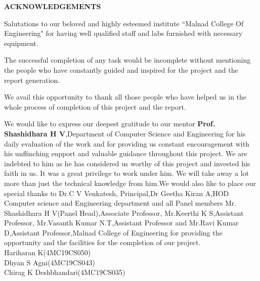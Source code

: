 \newpage
\vspace*{1\baselineskip}
\begin{center}
\thispagestyle{empty}
\LARGE{\textbf{ACKNOWLEDGEMENTS}}\\[1cm]
\end{center}
\vspace{0.05cm}
\doublespacing
Salutations to our beloved and highly esteemed institute ``Malnad College Of Engineering" for having well qualified staff and labs furnished with necessary equipment.

The successful completion of any task would be incomplete without mentioning the people who have constantly guided and inspired for the project and the report generation.

We avail this opportunity to thank all those people who have helped us in the whole process of completion of this project and the report.

We would like to express our deepest gratitude to our mentor {\textbf{Prof. Shashidhara H V}},Department of Computer Science and Engineering for his daily evaluation of the work and for providing us constant encouragement with his unflinching support and valuable guidance throughout this project. We are indebted to him as he has considered us worthy of this project and invested his faith in us. It was a great privilege to work under him. We will take away a lot more than just the technical knowledge from him.We would also like to place our special thanks to Dr.C V Venkatesh, Principal,Dr Geetha Kiran A,HOD Computer science and Engineering department and all Panel members Mr. Shashidhara H V(Panel Head),Associate Professor, Mr.Keerthi K S,Assistant Professor, Mr.Vasanth Kumar N.T,Assistant Professor and Mr.Ravi Kumar D,Assistant Professor,Malnad College of Engineering for providing the opportunity and the facilities for the completion of our project.\\

\large{\hspace*{3.5in} Hariharan K(4MC19CS050)}\\
\large{\hspace*{3.7in} Dhyan S Agni(4MC19CS043)}\\
\large{\hspace*{2.8in} Chirag K Deshbhandari(4MC19CS035)}\\


